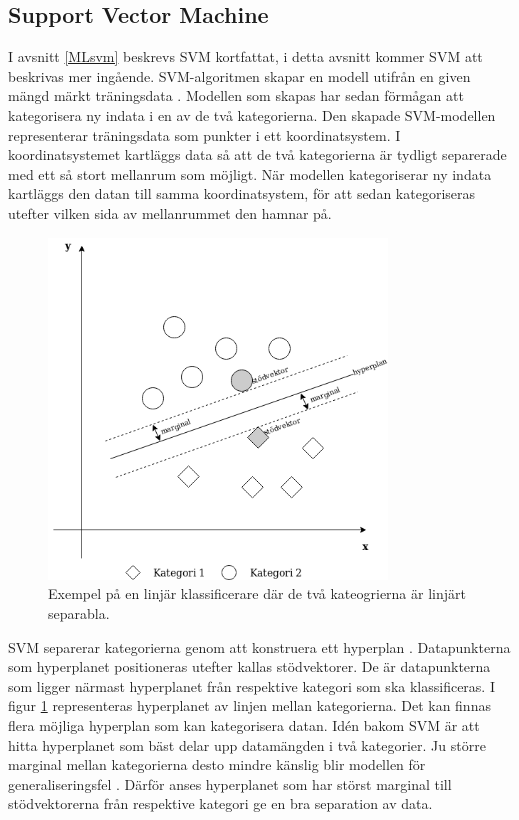 \documentclass{kaumasters} %
\begin{document}
\subsection{Support Vector Machine}
I avsnitt \ref{MLsvm} beskrevs SVM kortfattat, i detta avsnitt kommer SVM att beskrivas mer ingående. SVM-algoritmen skapar en modell utifrån en given mängd märkt träningsdata \cite{svm:002}. Modellen som skapas har sedan förmågan att kategorisera ny indata i en av de två kategorierna. Den skapade SVM-modellen representerar träningsdata som punkter i ett koordinatsystem. I koordinatsystemet kartläggs data så att de två kategorierna är tydligt separerade med ett så stort mellanrum som möjligt. När modellen kategoriserar ny indata kartläggs den datan till samma koordinatsystem, för att sedan kategoriseras utefter vilken sida av mellanrummet den hamnar på.

\begin{figure}[H]
\includegraphics[width=9cm]{linearsvm_hpwithmargins}
\centering
\caption{Exempel på en linjär klassificerare där de två kateogrierna är linjärt separabla.}
\label{fig:svmmarg}
\end{figure} 

SVM separerar kategorierna genom att konstruera ett hyperplan \cite{svm:003}. Datapunkterna som hyperplanet positioneras utefter kallas stödvektorer. De är datapunkterna som ligger närmast hyperplanet från respektive kategori som ska klassificeras. I figur \ref{fig:svmmarg} representeras hyperplanet av linjen mellan kategorierna. Det kan finnas flera möjliga hyperplan som kan kategorisera datan. Idén bakom SVM är att hitta hyperplanet som bäst delar upp datamängden i två kategorier. Ju större marginal mellan kategorierna desto mindre känslig blir modellen för generaliseringsfel \cite{svm:002}. Därför anses hyperplanet som har störst marginal till stödvektorerna från respektive kategori ge en bra separation av data.
\end{document}
